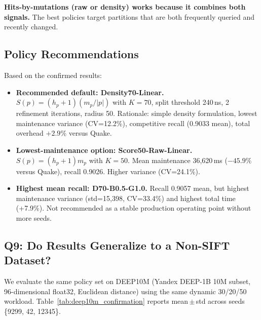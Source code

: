 \documentclass[sigconf, nonacm]{acmart}
\begin{document}
\textbf{Hits-by-mutations (raw or density) works because it combines
both signals.} The best policies target partitions that are both
frequently queried and recently changed.

\subsection{Policy Recommendations}
\label{sec:eval_recommendations}

Based on the confirmed results:

\begin{itemize}[leftmargin=*]
  \item \textbf{Recommended default: Density70-Linear.}
    $S(p) = (h_p+1)(m_p/|p|)$ with $K=70$, split threshold 240\,ns,
    2 refinement iterations, radius 50.
    Rationale: simple density formulation, lowest maintenance variance
    (CV=12.2\%), competitive recall (0.9033 mean), total overhead
    $+2.9\%$ versus Quake.

  \item \textbf{Lowest-maintenance option: Score50-Raw-Linear.}
    $S(p) = (h_p+1)m_p$ with $K=50$.
    Mean maintenance 36,620\,ms ($-45.9\%$ versus Quake), recall
    0.9026. Higher variance (CV=24.1\%).

  \item \textbf{Highest mean recall: D70-B0.5-G1.0.}
    Recall 0.9057 mean, but highest maintenance variance (std=15,398,
    CV=33.4\%) and highest total time (+7.9\%). Not recommended as
    a stable production operating point without more seeds.
\end{itemize}

\subsection{Q9: Do Results Generalize to a Non-SIFT Dataset?}
\label{sec:eval_deep10m}


We evaluate the same policy set on DEEP10M (Yandex DEEP-1B 10M
subset, 96-dimensional float32, Euclidean distance) using the same
dynamic 30/20/50 workload.
Table~\ref{tab:deep10m_confirmation} reports mean\,$\pm$\,std across
seeds \{9299, 42, 12345\}.
\end{document}
